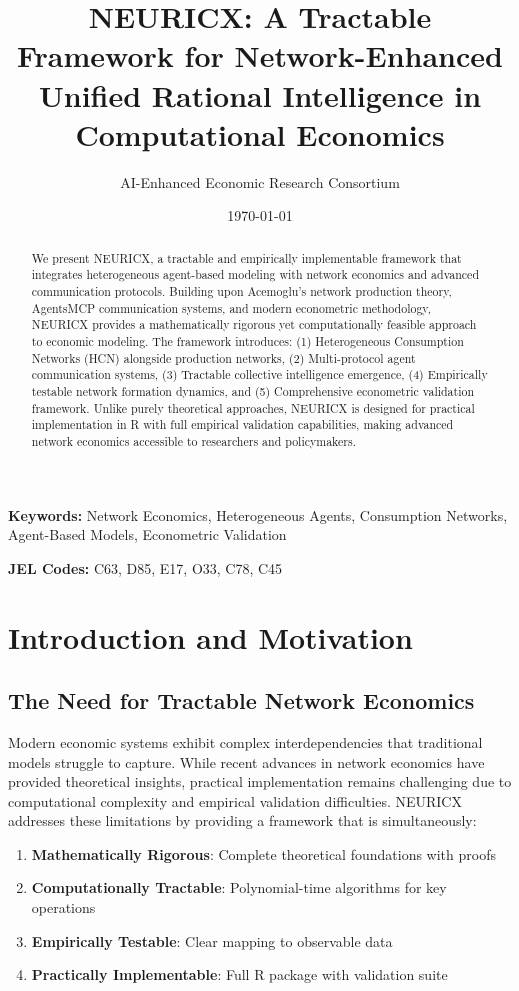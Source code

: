 \documentclass[12pt,a4paper]{article}
\title{NEURICX: A Tractable Framework for Network-Enhanced\\
Unified Rational Intelligence in Computational Economics}
\author{AI-Enhanced Economic Research Consortium}
\date{\today}
\begin{document}
\maketitle

\begin{abstract}
We present NEURICX, a tractable and empirically implementable framework that integrates heterogeneous agent-based modeling with network economics and advanced communication protocols. Building upon Acemoglu's network production theory, AgentsMCP communication systems, and modern econometric methodology, NEURICX provides a mathematically rigorous yet computationally feasible approach to economic modeling. The framework introduces: (1) Heterogeneous Consumption Networks (HCN) alongside production networks, (2) Multi-protocol agent communication systems, (3) Tractable collective intelligence emergence, (4) Empirically testable network formation dynamics, and (5) Comprehensive econometric validation framework. Unlike purely theoretical approaches, NEURICX is designed for practical implementation in R with full empirical validation capabilities, making advanced network economics accessible to researchers and policymakers.
\end{abstract}

\textbf{Keywords:} Network Economics, Heterogeneous Agents, Consumption Networks, Agent-Based Models, Econometric Validation

\textbf{JEL Codes:} C63, D85, E17, O33, C78, C45

\section{Introduction and Motivation}

\subsection{The Need for Tractable Network Economics}

Modern economic systems exhibit complex interdependencies that traditional models struggle to capture. While recent advances in network economics have provided theoretical insights, practical implementation remains challenging due to computational complexity and empirical validation difficulties. NEURICX addresses these limitations by providing a framework that is simultaneously:

\begin{enumerate}
\item \textbf{Mathematically Rigorous}: Complete theoretical foundations with proofs
\item \textbf{Computationally Tractable}: Polynomial-time algorithms for key operations
\item \textbf{Empirically Testable}: Clear mapping to observable data
\item \textbf{Practically Implementable}: Full R package with validation suite
\end{enumerate}
\end{document}
